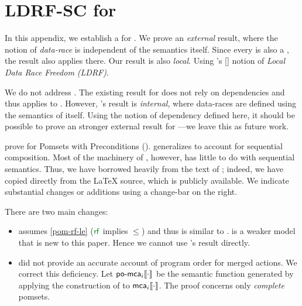 \section{LDRF-SC for \PwTmcaTITLE{}}
\label{sec:sc}

\cbstart
In this appendix, we establish a \drfsc{} for .  We prove an
\emph{external} result, where the notion of \emph{data-race} is independent
of the semantics itself.  Since every  is also a , the
result also applies there.  Our result is also \emph{local}.  Using
\citeauthor{Dolan:2018:BDR:3192366.3192421}'s
[\citeyear{Dolan:2018:BDR:3192366.3192421}] notion of \emph{Local Data Race
  Freedom (LDRF)}.

We do not address \PwTc{}.  The existing \drfsc{} result for \cXI{}
\cite{DBLP:phd/ethos/Batty15} does not rely on dependencies and thus applies
to \PwTc{}.  However, \citeauthor{DBLP:phd/ethos/Batty15}'s result is
\emph{internal}, where data-races are defined using the semantics of \cXI{}
itself.  Using the notion of dependency defined here, it should be possible
to prove an stronger external result for \cXI{}---we leave this as future
work.

\citet{DBLP:journals/pacmpl/JagadeesanJR20} prove \ldrfsc{} for Pomsets with
Preconditions (\PwP{}).  \PwTmca{} generalizes \PwP{} to account for
sequential composition.  Most of the machinery of \ldrfsc{}, however, has
little to do with sequential semantics.  Thus, we have borrowed heavily from
the text of \cite{DBLP:journals/pacmpl/JagadeesanJR20}; indeed, we have
copied directly from the \LaTeX{} source, which is publicly available.  We
indicate substantial changes or additions using a change-bar on the right.

There are two main changes:
\begin{itemize}
\item \PwP{} assumes \ref{pom-rf-le} ($\rrfx$ implies $\le$)
  and thus is similar to .   is a weaker model that is
  new to this paper.  Hence we cannot use
  \citeauthor{DBLP:journals/pacmpl/JagadeesanJR20}'s result directly.
\item \citeauthor{DBLP:journals/pacmpl/JagadeesanJR20} did not provide an
  accurate account of program order for merged actions.  We correct this
  deficiency.  Let $\sempomca{i}{}$ be the semantic function generated by
  applying the construction of  to $\semmca{i}{}$.  The proof
  concerns only \emph{complete} pomsets.
\end{itemize}

